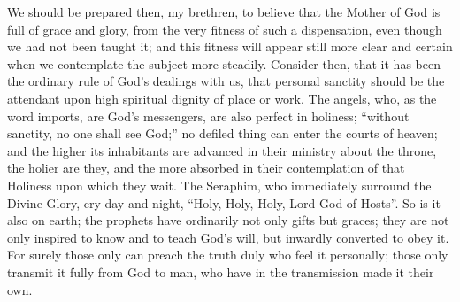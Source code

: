 We should be prepared then, my brethren, to believe that the Mother
of God is full of grace and glory, from the very fitness of such a
dispensation, even though we had not been taught it; and this fitness
will appear still more clear and certain when we contemplate the
subject more steadily. Consider then, that it has been the ordinary
rule of God's dealings with us, that personal sanctity should be the
attendant upon high spiritual dignity of place or work. The angels,
who, as the word imports, are God's messengers, are also perfect in
holiness; ``without sanctity, no one shall see God;'' no
defiled thing can enter the courts of heaven; and the higher its
inhabitants are advanced in their ministry about the throne, the
holier are they, and the more absorbed in their contemplation of that
Holiness upon which they wait. The Seraphim, who immediately surround
the Divine Glory, cry day and night, ``Holy, Holy, Holy, Lord God
of Hosts''. So is it also on earth; the prophets have ordinarily
not only gifts but graces; they are not only inspired to know and to
teach God's will, but inwardly converted to obey it. For surely those
only can preach the truth duly who feel it personally; those only
transmit it fully from God to man, who have in the transmission made
it their own.

